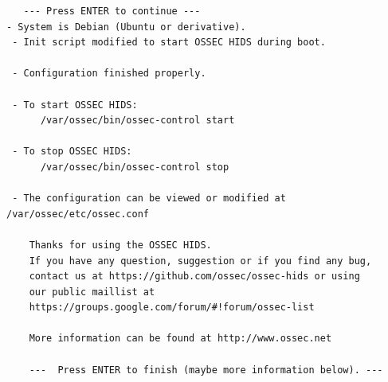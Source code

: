 \documentclass{article}
\begin{document}
\begin{verbatim}
   --- Press ENTER to continue ---
- System is Debian (Ubuntu or derivative).
 - Init script modified to start OSSEC HIDS during boot.

 - Configuration finished properly.

 - To start OSSEC HIDS:
      /var/ossec/bin/ossec-control start

 - To stop OSSEC HIDS:
      /var/ossec/bin/ossec-control stop

 - The configuration can be viewed or modified at /var/ossec/etc/ossec.conf

    Thanks for using the OSSEC HIDS.
    If you have any question, suggestion or if you find any bug,
    contact us at https://github.com/ossec/ossec-hids or using
    our public maillist at
    https://groups.google.com/forum/#!forum/ossec-list

    More information can be found at http://www.ossec.net

    ---  Press ENTER to finish (maybe more information below). ---
\end{verbatim}
\end{document}
